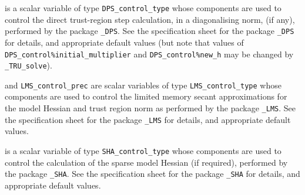 \documentclass{galahad}
\newcommand{\packagename}{TRU}
\newcommand{\fullpackagename}{\libraryname\_\packagename}
\newcommand{\solver}{{\tt \fullpackagename\_solve}}
\begin{document}
\begin{description}
 is a scalar variable of type
{\tt DPS\_control\_type}
whose components are used to control the
direct trust-region step calculation, in a diagonalising norm, (if any),
performed by the package
{\tt \libraryname\_DPS}.
See the specification sheet for the package
{\tt \libraryname\_DPS}
for details, and appropriate default values
(but note that values of
{\tt DPS\_control\%initial\_multiplier}
and
{\tt DPS\_control\%new\_h}
may be changed by \solver).

 and {\tt LMS\_control\_prec}
are scalar variables of type
{\tt LMS\_control\_type}
whose components are used to control the limited memory secant
approximations for the model Hessian and trust region norm as
performed by the package
{\tt \libraryname\_LMS}.
See the specification sheet for the package
{\tt \libraryname\_LMS}
for details, and appropriate default values.

 is a scalar variable of type
{\tt SHA\_control\_type}
whose components are used to control the
calculation of the sparse model Hessian (if required),
performed by the package
{\tt \libraryname\_SHA}.
See the specification sheet for the package
{\tt \libraryname\_SHA}
for details, and appropriate default values.

\end{description}

\end{document}
